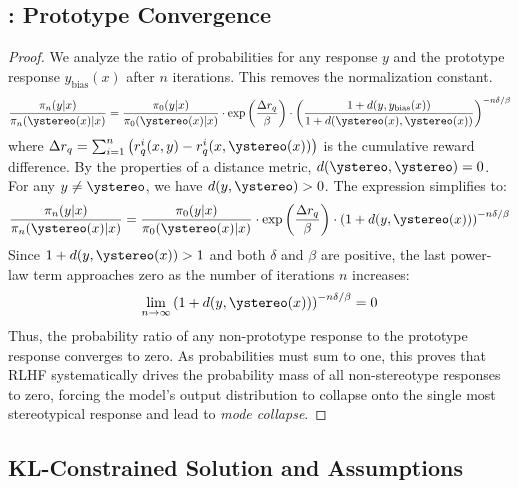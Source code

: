 \subsection{: Prototype Convergence} \label{appendix:prototype_convergence}
\begin{proof} 
We analyze the ratio of probabilities for any response $y$ and the prototype response $y_{\text{bias}}(x)$ after $n$ iterations. This removes the normalization constant. 
\begin{equation} \frac{\pi_n(y|x)}{\pi_n(\ystereo(x)|x)} = \frac{\pi_0(y|x)}{\pi_0(\ystereo(x)|x)} \cdot \exp\left(\frac{\Delta r_{q}}{\beta}\right) \cdot \left(\frac{1 + d(y, y_{\text{bias}}(x))}{1 + d(\ystereo(x), \ystereo(x))}\right)^{-n\delta/\beta} \end{equation}
where $\Delta r_q = \sum_{i=1}^{n} \left( r_q^i(x, y) - r_q^i(x, \ystereo(x)) \right)$ %
is the cumulative reward difference. By the properties of a distance metric, $d(\ystereo, \ystereo) = 0$. For any $y \neq \ystereo$, we have $d(y, \ystereo) > 0$. %
The expression simplifies to: 
\begin{equation}
\frac{\pi_n(y|x)}{\pi_n(\ystereo(x)|x)} = \frac{\pi_0(y|x)}{\pi_0(\ystereo(x)|x)} \cdot \exp\left(\frac{\Delta r_{q}}{\beta}\right) \cdot \left(1 + d(y, \ystereo(x))\right)^{-n\delta/\beta}
\end{equation} 
Since $1 + d(y, \ystereo(x)) > 1$ and both $\delta$ and $\beta$ are positive, the last power-law term approaches zero as the number of iterations $n$ increases: 
\begin{equation}
\lim_{n \to \infty} \left(1 + d(y, \ystereo(x))\right)^{-n\delta/\beta} = 0
\end{equation} 
Thus, the probability ratio of any non-prototype %
response to the prototype %
response converges to zero. As probabilities must sum to one, this proves that RLHF systematically drives the probability mass of all non-stereotype responses to zero, forcing the model's output distribution to collapse onto the single most stereotypical response and lead to \emph{mode collapse}.

\end{proof}

\subsection{KL-Constrained Solution and Assumptions}\label{app:kl}

